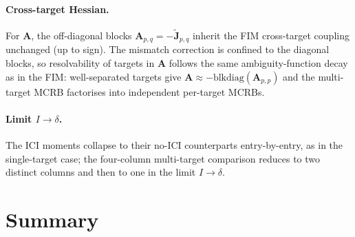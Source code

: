 \documentclass[11pt]{article}
\begin{document}
\paragraph{Cross-target Hessian.} For \(\bm{A}\), the off-diagonal blocks \(\bm{A}_{p,q} = -\tilde{\bm{J}}_{p,q}\) inherit the FIM cross-target coupling unchanged (up to sign). The mismatch correction is confined to the diagonal blocks, so resolvability of targets in \(\bm{A}\) follows the same ambiguity-function decay as in the FIM: well-separated targets give \(\bm{A} \approx -\mathrm{blkdiag}(\bm{A}_{p,p})\) and the multi-target MCRB factorises into independent per-target MCRBs.

\paragraph{Limit \(I \to \delta\).} The ICI moments collapse to their no-ICI counterparts entry-by-entry, as in the single-target case; the four-column multi-target comparison reduces to two distinct columns and then to one in the limit \(I \to \delta\).

\section{Summary}
\end{document}
